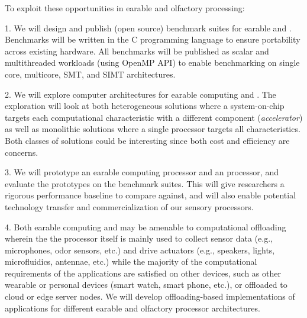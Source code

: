 To exploit these opportunities in earable and olfactory processing:
\iffalse
we propose to develop
tools for computer architects, hardware designers, software engineers, and
application developers to better understand sensory computing's software and
hardware ecosystems.  Specifically, the proposed research has two main thrusts,
the first related to \textit{earable computing} and the second to \textit{\olfc}.
The research goals along both thrusts parallel one another:
\fi

1. We will design and publish (open source) benchmark suites for earable and
\olfc{}.  
Benchmarks
will be written in the C programming language to ensure portability across
existing hardware.  All benchmarks will be published as scalar
and multithreaded workloads (using OpenMP API) to enable benchmarking on single
core, multicore, SMT, and SIMT architectures.

2. We will explore computer architectures for  earable computing and \olfc{}. The exploration will look at both heterogeneous solutions where a system-on-chip targets each computational characteristic with a different component ({\em accelerator}) as well as monolithic solutions where a single processor targets all characteristics. Both classes of solutions could be interesting since both cost and efficiency are concerns.

3. We will prototype an earable computing processor and an \olfc{}
processor, and evaluate the prototypes on the benchmark suites.  This will
give researchers a rigorous performance baseline to compare against, and will
also enable potential technology transfer and commercialization of our sensory
processors.

4. Both earable computing and \olfc{}  may be amenable to computational offloading wherein the
the processor itself is mainly used to collect sensor data (e.g.,
microphones, odor sensors, etc.) and drive actuators (e.g., speakers, lights,
microfluidics, antennae, etc.) while the majority of the computational
requirements of the applications are satisfied on other devices, such
as other wearable or personal devices (smart watch, smart phone, etc.), or
offloaded to cloud or edge server nodes. We will develop offloading-based implementations of applications for different earable and olfactory processor architectures.
